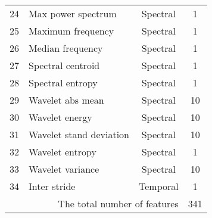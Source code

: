 {\begin{tabularx}{\linewidth}{@{}rlcc@{}}
  24 & Max power spectrum         & Spectral   & 1\\
  25 & Maximum frequency         & Spectral   & 1\\
  26 & Median frequency         & Spectral   & 1\\
  27 & Spectral centroid         & Spectral   & 1\\
  28 & Spectral entropy         & Spectral   & 1\\
  29 & Wavelet abs mean         & Spectral   & 10\\
  30 & Wavelet energy         & Spectral   & 10\\
  31 & Wavelet stand deviation         & Spectral   & 10\\
  32 & Wavelet entropy         & Spectral   & 1\\
  33 & Wavelet variance         & Spectral   & 10\\ \hline
  34 & Inter stride         & Temporal   & 1\\ \hline
\multicolumn{3}{r}{The total number of features} & 341\\
\end{tabularx}\hspace*{-4cm}
}


